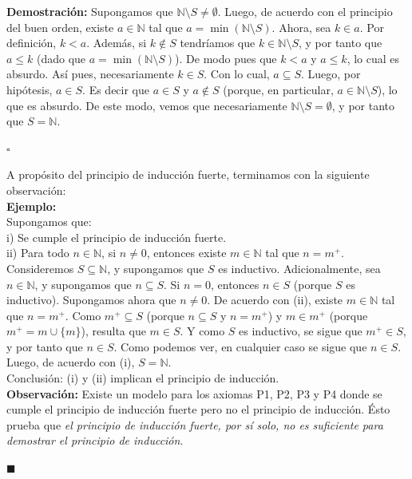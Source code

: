 \documentclass[10 pt]{article}
\begin{document}
\Large{\textbf{Demostración:} Supongamos que $\mathbb N \setminus S \neq \emptyset$. Luego, de acuerdo con el principio del buen orden, existe $a \in \mathbb N$ tal que $a=\min(\mathbb N \setminus S)$. Ahora, sea $k \in a$. Por definición, $k<a$. Además, si $k \notin S$ tendríamos que $k \in \mathbb N \setminus S$, y por tanto que $a \leq k$ (dado que $a=\min(\mathbb N \setminus S)$). De modo pues que $k<a$ y $a \leq k$, lo cual es absurdo. Así pues, necesariamente $k \in S$. Con lo cual, $a \subseteq S$. Luego, por hipótesis, $a \in S$. Es decir que $a \in S$ y $a \notin S$ (porque, en particular, $a \in \mathbb N \setminus S$), lo que es absurdo. De este modo, vemos que necesariamente $\mathbb N \setminus S=\emptyset$, y por tanto que $S=\mathbb N$.} \\

\begin{flushright}
    $\square$
\end{flushright}

\Large{A propósito del principio de inducción fuerte, terminamos con la siguiente observación:} \\

\Large{\textbf{Ejemplo:}} \\

\Large{Supongamos que: \\

i) Se cumple el principio de inducción fuerte. \\

ii) Para todo $n \in \mathbb N$, si $n \neq 0$, entonces existe $m\in \mathbb N$ tal que $n=m^+$. \\

Consideremos $S \subseteq \mathbb N$, y supongamos que $S$ es inductivo. Adicionalmente, sea $n \in \mathbb N$, y supongamos que $n \subseteq S$. Si $n=0$, entonces $n \in S$ (porque $S$ es inductivo). Supongamos ahora que $n \neq 0$. De acuerdo con (ii), existe $m \in \mathbb N$ tal que $n=m^+$. Como $m^+ \subseteq S$ (porque $n \subseteq S$ y $n=m^+$) y $m \in m^+$ (porque $m^+=m \cup \{m\}$), resulta que $m \in S$. Y como $S$ es inductivo, se sigue que $m^+ \in S$, y por tanto que $n \in S$. Como podemos ver, en cualquier caso se sigue que $n \in S$. Luego, de acuerdo con (i), $S=\mathbb N$. \\

Conclusión: (i) y (ii) implican el principio de inducción.} \\

\Large{\textbf{Observación:} Existe un modelo para los axiomas P1, P2, P3 y P4 donde se cumple el principio de inducción fuerte pero no el principio de inducción. Ésto prueba que \textit{el principio de inducción fuerte, por sí solo, no es suficiente para demostrar el principio de inducción}.} \\

\begin{flushright}
    $\blacksquare$
\end{flushright}
\end{document}
